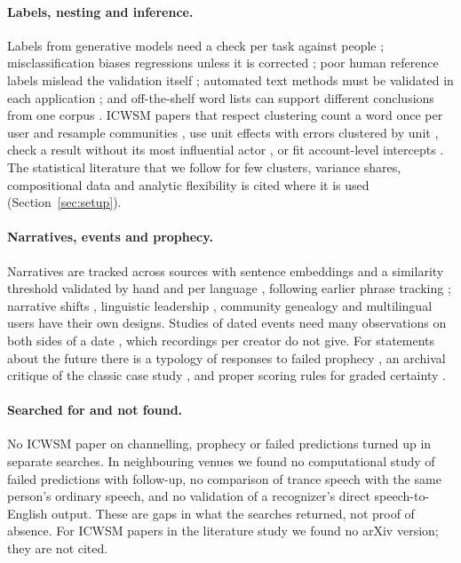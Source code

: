 \documentclass[letterpaper]{article} %
\begin{document}
\paragraph{Labels, nesting and inference.} Labels from generative models need a check per task against people \cite{pangakis2024keeping}; misclassification biases regressions unless it is corrected \cite{teblunthuis2023misclassification}; poor human reference labels mislead the validation itself \cite{song2020validations}; automated text methods must be validated in each application \cite{grimmer2013text}; and off-the-shelf word lists can support different conclusions from one corpus \cite{chan2021four}. ICWSM papers that respect clustering count a word once per user and resample communities \cite{zhang2017community}, use unit effects with errors clustered by unit \cite{hu2022quotatives,russo2022spillover}, check a result without its most influential actor \cite{hu2022quotatives}, or fit account-level intercepts \cite{colglazier2024effects}. The statistical literature that we follow for few clusters, variance shares, compositional data and analytic flexibility is cited where it is used (Section~\ref{sec:setup}).

\paragraph{Narratives, events and prophecy.} Narratives are tracked across sources with sentence embeddings and a similarity threshold validated by hand and per language \cite{hanley2022happenstance,hanley2023partial,gerard2024modeling,gerard2025bridging}, following earlier phrase tracking \cite{leskovec2009memetracking}; narrative shifts \cite{zhao2023discovering}, linguistic leadership \cite{roytburg2024words}, community genealogy \cite{tan2018tracing} and multilingual users \cite{mendelsohn2023bridging} have their own designs. Studies of dated events need many observations on both sides of a date \cite{hortaribeiro2020sudden,habib2021reddit,russo2022spillover,colglazier2024effects,attanasio2025effects}, which \NPerCreator{} recordings per creator do not give. For statements about the future there is a typology of responses to failed prophecy \cite{dawson1999prophecy}, an archival critique of the classic case study \cite{kelly2026debunking}, and proper scoring rules for graded certainty \cite{gneiting2007strictly}.

\paragraph{Searched for and not found.} No ICWSM paper on channelling, prophecy or failed predictions turned up in \NIcwsmSearches{} separate searches. In neighbouring venues we found no computational study of failed predictions with follow-up, no comparison of trance speech with the same person's ordinary speech, and no validation of a recognizer's direct speech-to-English output. These are gaps in what the searches returned, not proof of absence. For \NIcwsmNoArxiv{} ICWSM papers in the literature study we found no arXiv version; they are not cited.
\end{document}
